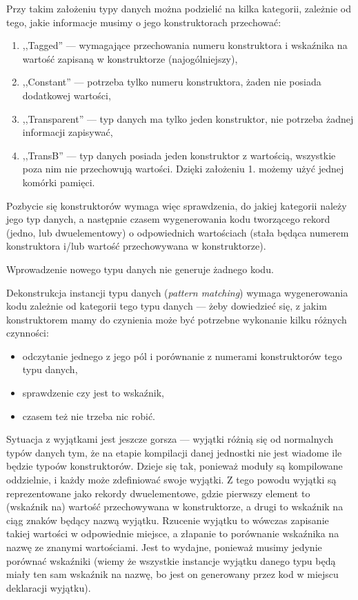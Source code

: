 \documentclass[11pt]{scrartcl}
\begin{document}
Przy takim założeniu typy danych można podzielić na kilka kategorii, zależnie od
tego, jakie informacje musimy o jego konstruktorach przechować:

\begin{enumerate}
\item ,,Tagged'' --- wymagające przechowania numeru konstruktora i wskaźnika na
  wartość zapisaną w konstruktorze (najogólniejszy),
\item ,,Constant'' --- potrzeba tylko numeru konstruktora, żaden nie posiada
  dodatkowej wartości,
\item ,,Transparent'' --- typ danych ma tylko jeden konstruktor, nie potrzeba żadnej
  informacji zapisywać,
\item ,,TransB'' --- typ danych posiada jeden konstruktor z wartością, wszystkie
  poza nim nie przechowują wartości. Dzięki założeniu 1. możemy użyć jednej komórki
  pamięci.
\end{enumerate}

Pozbycie się konstruktorów wymaga więc sprawdzenia, do jakiej kategorii należy
jego typ danych, a następnie czasem wygenerowania kodu tworzącego rekord (jedno, lub
dwuelementowy) o odpowiednich wartościach (stała będąca numerem konstruktora
i/lub wartość przechowywana w konstruktorze).

Wprowadzenie nowego typu danych nie generuje żadnego kodu.

Dekonstrukcja instancji typu danych (\textit{pattern matching}) wymaga wygenerowania kodu
zależnie od kategorii tego typu danych --- żeby dowiedzieć się, z jakim
konstruktorem mamy do czynienia może być potrzebne wykonanie kilku różnych
czynności:
\begin{itemize}
\item odczytanie jednego z jego pól i porównanie z numerami konstruktorów tego
  typu danych,
\item sprawdzenie czy jest to wskaźnik,
\item czasem też nie trzeba nic robić.
\end{itemize}

Sytuacja z wyjątkami jest jeszcze gorsza --- wyjątki różnią się od normalnych
typów danych tym, że na etapie kompilacji danej jednostki nie jest wiadome ile
będzie typoów
konstruktorów. Dzieje się tak, ponieważ moduły są kompilowane oddzielnie, i
każdy może zdefiniować swoje wyjątki. Z tego powodu wyjątki są reprezentowane
jako rekordy dwuelementowe, gdzie pierwszy element to (wskaźnik na) wartość
przechowywana w konstruktorze, a drugi to wskaźnik na ciąg znaków będący nazwą
wyjątku. Rzucenie wyjątku to wówczas zapisanie takiej wartości w odpowiednie
miejsce, a złapanie to porównanie wskaźnika na nazwę ze znanymi wartościami.
Jest to wydajne, ponieważ musimy jedynie porównać wskaźniki (wiemy że wszystkie
instancje wyjątku danego typu będą miały ten sam wskaźnik na nazwę, bo jest on
generowany przez kod w miejscu deklaracji wyjątku).
\end{document}
